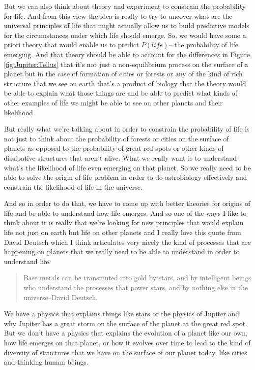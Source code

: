 \documentclass[]{article}
\begin{document}
But we can also think about theory
and experiment to constrain the
probability for life. And from this view
the idea is really to try to uncover
what are the universal principles of
life that might actually allow us to
build predictive models for the
circumstances under which life should
emerge. So, we would have some a priori
theory that would enable us to predict $P(life)$--
the probability of life emerging.
And  that theory should be
able to account for the differences in Figure \ref{fig:Jupiter:Tellus} that
it's not just a non-equilibrium process
on the surface of a planet but in the
case of formation of cities or forests
or any of the kind of rich structure
that we see on earth that's a product of
biology that the theory would be able to
explain what those things are and be
able to predict what kinds of other
examples of life we might be able to see
on other planets and their likelihood.

But really what we're talking about in
order to constrain the probability of
life is not just to think about the
probability of forests or cities on the
surface of planets as opposed to the
probability of great red spots or other
kinds of dissipative structures that
aren't alive. What we really want is to
understand what's the likelihood of life
even emerging on that planet.
So we really need to be able to solve
the origin of life problem in order to do
astrobiology effectively and constrain
the likelihood of life in the universe.

And so in order to do that, we have to
come up with better theories for origins
of life and be able to understand how
life emerges. And so one of the ways I
like to think about it is really that
we're looking for new principles that
would explain life not just on earth but
life on other planets and I really love
this quote from David Deutsch which I
think articulates very nicely the kind
of processes that are happening on
planets that we really need to be able
to understand in order to understand
life. 

\begin{quotation}
	Base metals can be transmuted into gold by stars, and by intelligent beings who understand the processes that power stars, and by nothing else in the universe--David Deutsch\cite{deutsch2011beginning}.
\end{quotation}

We have a physics that explains things like stars or the physics of Jupiter and why Jupiter has a great storm on the surface of the planet at the great red spot.
But we don't have a physics that explains the evolution of a planet like our own, how life emerges on that planet, or how it evolves over time to lead to the kind of diversity of structures that we have on the surface of our planet today, like cities and
thinking human beings.
\end{document}
